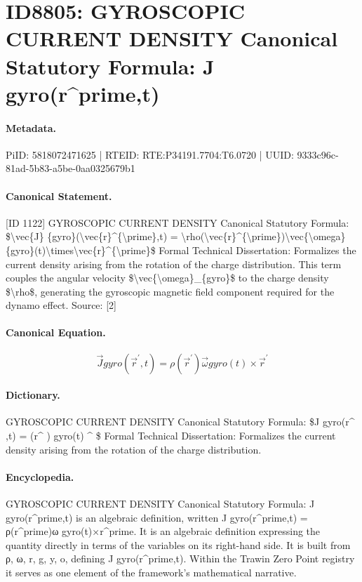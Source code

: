 \section*{ID8805: GYROSCOPIC CURRENT DENSITY Canonical Statutory Formula: J gyro(r\textasciicircum{}prime,t)}
\paragraph{Metadata.}
PiID: 5818072471625 | RTEID: RTE:P34191.7704:T6.0720 | UUID: 9333c96c-81ad-5b83-a5be-0aa0325679b1

\paragraph{Canonical Statement.}
[ID 1122] GYROSCOPIC CURRENT DENSITY Canonical Statutory Formula: \$\textbackslash{}vec\{J\} \{gyro\}(\textbackslash{}vec\{r\}\textasciicircum{}\{\textbackslash{}prime\},t) = \textbackslash{}rho(\textbackslash{}vec\{r\}\textasciicircum{}\{\textbackslash{}prime\})\textbackslash{}vec\{\textbackslash{}omega\} \{gyro\}(t)\textbackslash{}times\textbackslash{}vec\{r\}\textasciicircum{}\{\textbackslash{}prime\}\$ Formal Technical Dissertation: Formalizes the current density arising from the rotation of the charge distribution. This term couples the angular velocity \$\textbackslash{}vec\{\textbackslash{}omega\}\_\{gyro\}\$ to the charge density \$\textbackslash{}rho\$, generating the gyroscopic magnetic field component required for the dynamo effect. Source: [2]

\paragraph{Canonical Equation.}
\[
\vec{J} {gyro}(\vec{r}^{\prime},t) = \rho(\vec{r}^{\prime})\vec{\omega} {gyro}(t)\times\vec{r}^{\prime}
\]

\paragraph{Dictionary.}
GYROSCOPIC CURRENT DENSITY Canonical Statutory Formula: \$J gyro(r\textasciicircum{} ,t) = (r\textasciicircum{} ) gyro(t) \textasciicircum{} \$ Formal Technical Dissertation: Formalizes the current density arising from the rotation of the charge distribution.

\paragraph{Encyclopedia.}
GYROSCOPIC CURRENT DENSITY Canonical Statutory Formula: J gyro(r\textasciicircum{}prime,t) is an algebraic definition, written J gyro(r\textasciicircum{}prime,t) = ρ(r\textasciicircum{}prime)ω gyro(t)×r\textasciicircum{}prime. It is an algebraic definition expressing the quantity directly in terms of the variables on its right-hand side. It is built from ρ, ω, r, g, y, o, defining J gyro(r\textasciicircum{}prime,t). Within the Trawin Zero Point registry it serves as one element of the framework's mathematical narrative.
